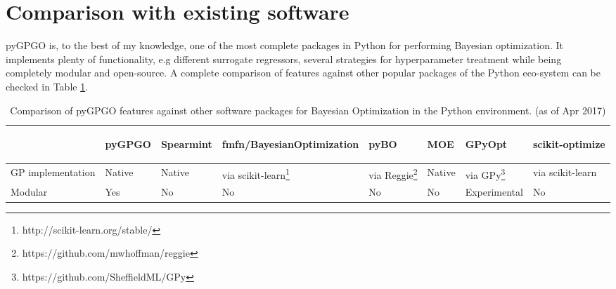 \documentclass[10pt,a4paper,twoside]{book}
\begin{document}
\section{Comparison with existing software}

pyGPGO is, to the best of my knowledge, one of the most complete packages in Python for performing Bayesian optimization. It implements plenty of functionality, e.g different surrogate regressors, several strategies for hyperparameter treatment while being completely modular and open-source. A complete comparison of features against other popular packages of the Python eco-system can be checked in Table \ref{featurecomp}.

\newpage

\begin{table}
\centering
\caption{Comparison of pyGPGO features against other software packages for Bayesian Optimization in the Python environment. (as of Apr 2017)}
\label{featurecomp}
\begin{adjustbox}{width=1\textwidth}
\begin{tabular}{@{}llllllll@{}}
\toprule
                                   & \begin{sideways}pyGPGO\end{sideways}                   & \begin{sideways}Spearmint\end{sideways}  & \begin{sideways}fmfn/BayesianOptimization\end{sideways} & \begin{sideways}pyBO\end{sideways}        & \begin{sideways}MOE\end{sideways}    & \begin{sideways}GPyOpt\end{sideways}          & \begin{sideways}scikit-optimize\end{sideways}   \\ \midrule
GP implementation                  & Native                   & Native     & via scikit-learn\footnote{http://scikit-learn.org/stable/} & via Reggie\footnote{https://github.com/mwhoffman/reggie} & Native & via GPy\footnote{https://github.com/SheffieldML/GPy}        & via scikit-learn \\
Modular                            & \color{green}Yes                      & \color{red} No         & \color{red} No                        & \color{red} No         & \color{red} No    & Experimental    & \color{red} No               \\

\end{tabular}
\end{adjustbox}
\end{table}
\end{document}
